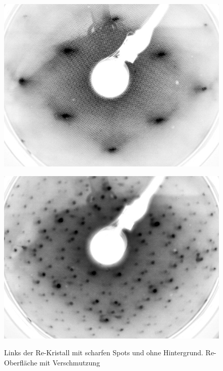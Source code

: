 \FloatBarrier


\begin{figure}[htbp]
	\begin{minipage}[b]{0.5\textwidth} 
		\includegraphics[width=\textwidth]{LEED-Bilder/bearbeitet/unbedampft_E207}
		\label{Bild} 
	\end{minipage}
	\hfill
	\begin{minipage}[b]{0.5\textwidth}
		\includegraphics[width=\textwidth]{LEED-Bilder/bearbeitet/unbedampft_E207_MitteKristall.jpg}
		\label{Bild} 
	\end{minipage}
	\caption{Links der Re-Kristall mit scharfen Spots und ohne Hintergrund. Re-Oberfläche mit
	Verschmutzung}
\end{figure}

